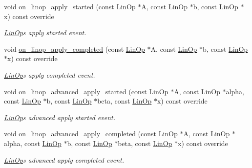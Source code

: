 \begin{DoxyCompactItemize}
void \hyperlink{classgko_1_1log_1_1Record_a892b07a5387719e02d8b9f9c5d3844b8}{on\+\_\+linop\+\_\+apply\+\_\+started} (const \hyperlink{classgko_1_1LinOp}{Lin\+Op} $\ast$A, const \hyperlink{classgko_1_1LinOp}{Lin\+Op} $\ast$b, const \hyperlink{classgko_1_1LinOp}{Lin\+Op} $\ast$x) const override
\begin{DoxyCompactList}\small\item\em \hyperlink{classgko_1_1LinOp}{Lin\+Op}\textquotesingle{}s apply started event. \end{DoxyCompactList}\item 
void \hyperlink{classgko_1_1log_1_1Record_a54adbb5c0abd1f2b08865a45857d4585}{on\+\_\+linop\+\_\+apply\+\_\+completed} (const \hyperlink{classgko_1_1LinOp}{Lin\+Op} $\ast$A, const \hyperlink{classgko_1_1LinOp}{Lin\+Op} $\ast$b, const \hyperlink{classgko_1_1LinOp}{Lin\+Op} $\ast$x) const override
\begin{DoxyCompactList}\small\item\em \hyperlink{classgko_1_1LinOp}{Lin\+Op}\textquotesingle{}s apply completed event. \end{DoxyCompactList}\item 
void \hyperlink{classgko_1_1log_1_1Record_a39c554168e6c84594ee9a91a7f9b0f9c}{on\+\_\+linop\+\_\+advanced\+\_\+apply\+\_\+started} (const \hyperlink{classgko_1_1LinOp}{Lin\+Op} $\ast$A, const \hyperlink{classgko_1_1LinOp}{Lin\+Op} $\ast$alpha, const \hyperlink{classgko_1_1LinOp}{Lin\+Op} $\ast$b, const \hyperlink{classgko_1_1LinOp}{Lin\+Op} $\ast$beta, const \hyperlink{classgko_1_1LinOp}{Lin\+Op} $\ast$x) const override
\begin{DoxyCompactList}\small\item\em \hyperlink{classgko_1_1LinOp}{Lin\+Op}\textquotesingle{}s advanced apply started event. \end{DoxyCompactList}\item 
void \hyperlink{classgko_1_1log_1_1Record_a09aa11420a9774e495e8a97b8f29582c}{on\+\_\+linop\+\_\+advanced\+\_\+apply\+\_\+completed} (const \hyperlink{classgko_1_1LinOp}{Lin\+Op} $\ast$A, const \hyperlink{classgko_1_1LinOp}{Lin\+Op} $\ast$alpha, const \hyperlink{classgko_1_1LinOp}{Lin\+Op} $\ast$b, const \hyperlink{classgko_1_1LinOp}{Lin\+Op} $\ast$beta, const \hyperlink{classgko_1_1LinOp}{Lin\+Op} $\ast$x) const override
\begin{DoxyCompactList}\small\item\em \hyperlink{classgko_1_1LinOp}{Lin\+Op}\textquotesingle{}s advanced apply completed event. \end{DoxyCompactList}\item 

\end{DoxyCompactItemize}
